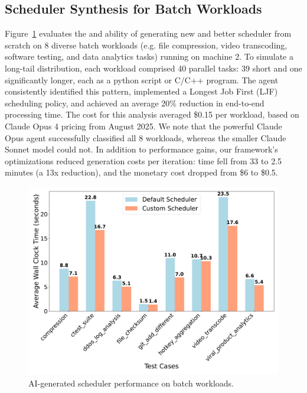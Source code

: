 \subsection{Scheduler Synthesis for Batch Workloads}

Figure~\ref{fig:batch-performance} evaluates the \sys  and \agent  ability of generating new and better scheduler from scratch on 8 diverse batch workloads (e.g. file compression, video transcoding, software testing, and data analytics tasks) running on machine 2. To simulate a long-tail distribution, each workload comprised 40 parallel tasks: 39 short and one significantly longer, each as a python script or C/C++ program. The agent consistently identified this pattern, implemented a Longest Job First (LJF) scheduling policy, and achieved an average 20\% reduction in end-to-end processing time. The cost for this analysis averaged \$0.15 per workload, based on Claude Opus 4 pricing from August 2025. We note that the powerful Claude Opus agent successfully classified all 8 workloads, whereas the smaller Claude Sonnet model could not. In addition to performance gains, our framework's optimizations reduced generation costs per iteration: time fell from 33 to 2.5 minutes (a 13x reduction), and the monetary cost dropped from \$6 to \$0.5.

\begin{figure}[h]
\centering
\includegraphics[width=0.9\columnwidth]{sections/scheduler_performance_comparison.pdf}
\caption{AI-generated scheduler performance on batch workloads.}
\label{fig:batch-performance}
\end{figure}


